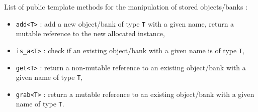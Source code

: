 \pn List  of public  template methods for  the manipulation  of stored
objects/banks :

\begin{itemize}

\item \texttt{add<T>} : add a new object/bank of type \texttt{T} with
  a given name, return a mutable reference to the new allocated instance,

\item \texttt{is\_a<T>} : check if an existing object/bank with a given
  name is of type \texttt{T},

\item \texttt{get<T>} : return a non-mutable reference to an existing object/bank
  with a given name of type \texttt{T},

\item \texttt{grab<T>} : return a mutable reference to an existing object/bank
  with a given name of type \texttt{T}.

\end{itemize}



